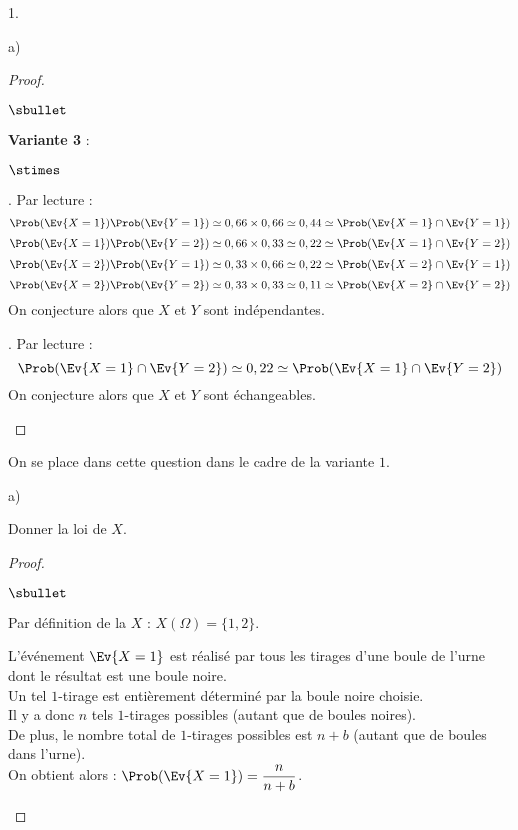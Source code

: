 \documentclass[11pt]{article}%
\begin{document}
\begin{noliste}{1.}
\begin{noliste}{a)}
\begin{proof}
\begin{noliste}{$\sbullet$}
    \item {\bf Variante 3} : 
    \begin{noliste}{$\stimes$}
    \item {}. Par lecture :
    \[
     \Prob(\Ev{X=1}) \Prob(\Ev{Y=1}) \simeq 0,66 \times 0,66
     \simeq 0,44 \simeq \Prob(\Ev{X=1} \cap \Ev{Y=1})
    \]
    \[
     \Prob(\Ev{X=1}) \Prob(\Ev{Y=2}) \simeq 0,66 \times 0,33
     \simeq 0,22 \simeq \Prob(\Ev{X=1} \cap \Ev{Y=2})
    \]
    \[
     \Prob(\Ev{X=2}) \Prob(\Ev{Y=1}) \simeq 0,33 \times 0,66
     \simeq 0,22 \simeq \Prob(\Ev{X=2} \cap \Ev{Y=1})
    \]
    \[
     \Prob(\Ev{X=2}) \Prob(\Ev{Y=2}) \simeq 0,33 \times 0,33
     \simeq 0,11 \simeq \Prob(\Ev{X=2} \cap \Ev{Y=2})
    \]
    On conjecture alors que $X$ et $Y$ sont indépendantes.
    
    \item {}. Par lecture :
    \[
     \Prob(\Ev{X=1} \cap \Ev{Y=2}) \simeq 
     0,22 \simeq \Prob(\Ev{X=1} \cap \Ev{Y=2})
    \]
    On conjecture alors que $X$ et $Y$ sont échangeables.
    \end{noliste}
  \end{noliste}
\end{proof}



\newpage



\end{noliste}
\item On se place dans cette question dans le cadre de la variante $1$.
\begin{noliste}{a)}
\item Donner la loi de $X$.


\begin{proof}~
 \begin{noliste}{$\sbullet$}
  \item Par définition de la \var $X$ : $X(\Omega)=\{1,2\}$.
  
  \item L'événement $\Ev{X=1}$ est réalisé par tous les tirages d'une
    boule de l'urne dont le résultat est une boule noire.\\
    Un tel $1$-tirage est entièrement déterminé par la boule noire choisie.\\
    Il y a donc $n$ tels $1$-tirages possibles (autant que de boules
    noires).\\
    De plus, le nombre total de $1$-tirages possibles est $n+b$
    (autant que de boules dans l'urne).\\[.2cm]
    On obtient alors : $\Prob(\Ev{X=1})=\dfrac{n}{n+b}$.
  

\end{noliste}
\end{proof}
\end{noliste}
\end{noliste}
\end{document}
